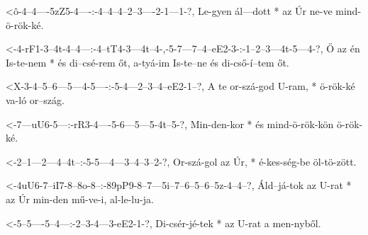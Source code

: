 


  {<ô-4--4----5zZ5-4----:-4--4--4--2--3----2-1---1-?,}
  {   Le-gyen ál---dott * az Úr ne-ve mind-ö-rök-ké.}



  {<-4-rF1-3--4t-4--4---:-4--tT4-3---4t--4-,-5-7---7--4--eE2-3-:-1--2--3---4t-5---4-?,}
  {  Ő az  én Is-te-nem * és di--csé-rem őt, a-tyá-im Is-te--ne  és di-cső-í--tem őt.}

  {<X-3-4--5--6---5---4-5----:-5-4---2--3--4--eE2-1--?,}
  {   A te or-szá-god U-ram, * ö-rök-ké va-ló or--szág.}

  {<-7---uU6-5---:-rR3-4----5-6---5---5-4t--5-?,}
  {  Min-den-kor * és  mind-ö-rök-kön ö-rök-ké.}



  {<-2--1---2---4--4t--:-5-5---4---3--4--3--2-?,}
  {  Or-szá-gol az Úr, * é-kes-ség-be öl-tö-zött.}

  {<-4uU6-7--iI7-8--8o-8--:-89pP9-8--7---5i--7--6--5--6--5z-4--4--?,}
  {  Áld--já-tok az U-rat * az    Úr min-den mű-ve-i, al-le-lu-ja.}

  {<-5--5----5--4---:-2--3-4---3-eE2-1-?,}
  {  Di-csér-jé-tek * az U-rat a men-nyből.}



